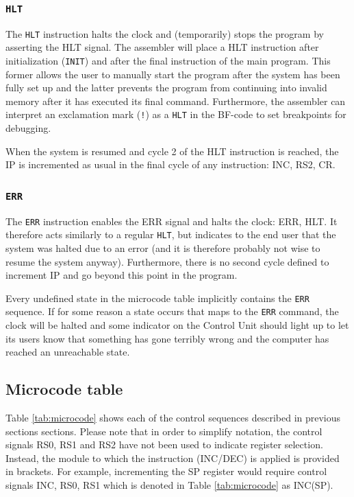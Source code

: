 \subsubsection{\texttt{HLT}}
The \texttt{HLT} instruction halts the clock and (temporarily) stops the program by asserting the HLT signal. The assembler will place a HLT instruction after initialization (\texttt{INIT}) and after the final instruction of the main program. This former allows the user to manually start the program after the system has been fully set up and the latter prevents the program from continuing into invalid memory after it has executed its final command. Furthermore, the assembler can interpret an exclamation mark (\texttt{!}) as a \texttt{HLT} in the BF-code to set breakpoints for debugging.

When the system is resumed and cycle 2 of the HLT instruction is reached, the IP is incremented as usual in the final cycle of any instruction: INC, RS2, CR.

\subsubsection{\texttt{ERR}}
The \texttt{ERR} instruction enables the ERR signal and halts the clock: ERR, HLT. It therefore acts similarly to a regular \texttt{HLT}, but indicates to the end user that the system was halted due to an error (and it is therefore probably not wise to resume the system anyway). Furthermore, there is no second cycle defined to increment IP and go beyond this point in the program.

Every undefined state in the microcode table implicitly contains the \texttt{ERR} sequence. If for some reason a state occurs that maps to the \texttt{ERR} command, the clock will be halted and some indicator on the Control Unit should light up to let its users know that something has gone terribly wrong and the computer has reached an unreachable state.

\subsection{Microcode table}
Table \ref{tab:microcode} shows each of the control sequences described in previous sections sections. Please note that in order to simplify notation, the control signals RS0, RS1 and RS2 have not been used to indicate register selection. Instead, the module to which the instruction (INC/DEC) is applied is provided in brackets. For example, incrementing the SP register would require control signals INC, RS0, RS1 which is denoted in Table \ref{tab:microcode} as INC(SP).
\newpage





